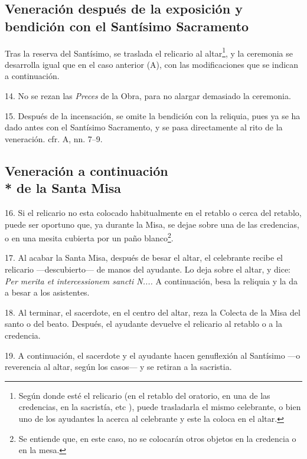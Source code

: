 \subsection[Veneración de la reliquia]{Veneración después de la exposición y bendición con el Santísimo Sacramento}



Tras la reserva del Santísimo, se traslada el relicario al altar\footnote{Según donde esté el relicario (en el retablo del oratorio, en una de las credencias, en la sacristía, etc ), puede trasladarla el mismo celebrante, o bien uno de los ayudantes la acerca al celebrante y este la coloca en el altar.}, y la ceremonia se desarrolla igual que en el caso anterior (A), con las modificaciones que se indican a continuación.

14.	No se rezan las \emph{Preces} de la Obra, para no alargar demasiado la ceremonia.

15.	Después de la incensación, se omite la bendición con la reliquia, pues ya se ha dado antes con el Santísimo Sacramento, y se pasa directamente al rito de la veneración. cfr. A, nn. 7--9.

\subsection[Veneración a continuación de la Santa Misa]{ Veneración a continuación \\* de la Santa Misa}

16.	Si el relicario no esta colocado habitualmente en el retablo o cerca del retablo, puede ser oportuno que, ya durante la Misa, se dejae sobre una de las credencias, o en una mesita cubierta por un paño blanco\footnote{Se entiende que, en este caso, no se colocarán otros objetos en la credencia o en la mesa.}.

17.	Al acabar la Santa Misa, después de besar el altar, el celebrante recibe el relicario ---descubierto--- de manos del ayudante. Lo deja sobre el altar, y dice: \emph{Per merita et intercessionem sancti  {\color {rubrica}N.}...} A continuación, besa la reliquia y la da a besar a los asistentes.

18.	Al terminar, el sacerdote, en el centro del altar, reza la Colecta de la Misa del santo o del beato. Después, el ayudante devuelve el relicario al retablo o a la credencia.

19.	A continuación, el sacerdote y el ayudante hacen genuflexión al Santísimo ---o reverencia al altar, según los casos--- y se retiran a la sacristia.